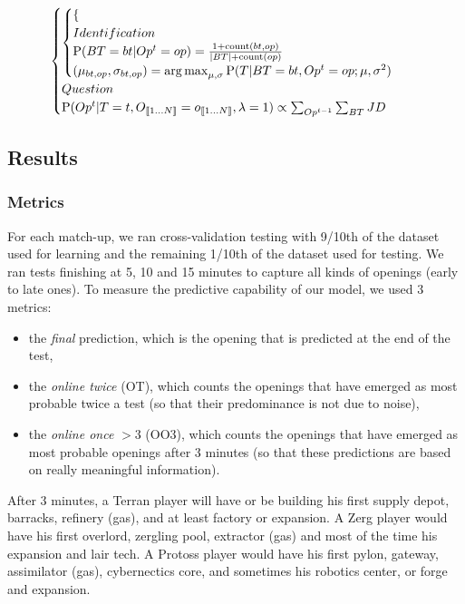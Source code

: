 \begin{eqnarray*}
\begin{cases}
\begin{cases}
\begin{cases}
        \end{cases}\\
    Identification\\
            \mathrm{P}(BT=bt | Op^t=op) = \frac{1 + \mathrm{count}(bt,op)}{\left\lvert BT\right\rvert + \mathrm{count}(op)}\\
            (\mu_{bt,op},\sigma_{bt,op}) = \operatorname*{arg\,max}_{\mu,\sigma}\mathrm{P}(T|BT=bt, Op^t=op; \mu,\sigma^2)\\
    \end{cases}\\
Question \\
 \mathrm{P}(Op^t|T=t, O_{\llbracket 1\dots N\rrbracket}=o_{\llbracket 1\dots N\rrbracket}, \lambda = 1) \propto \sum_{Op^{t-1}}\sum_{BT} JD \\
\end{cases}
\end{eqnarray*}


\subsection{Results}

\subsubsection{Metrics}
For each match-up, we ran cross-validation testing with 9/10th of the dataset used for learning and the remaining 1/10th of the dataset used for testing. We ran tests finishing at 5, 10 and 15 minutes to capture all kinds of openings (early to late ones). To measure the predictive capability of our model, we used 3 metrics: 
\begin{itemize}
\item the \textit{final} prediction, which is the opening that is predicted at the end of the test, 
\item the \textit{online twice} (OT), which counts the openings that have emerged as most probable twice a test (so that their predominance is not due to noise),
\item the \textit{online once} $> 3$ (OO3), which counts the openings that have emerged as most probable openings after 3 minutes (so that these predictions are based on really meaningful information).
\end{itemize}
After 3 minutes, a Terran player will have or be building his first supply depot, barracks, refinery (gas), and at least factory or expansion. A Zerg player would have his first overlord, zergling pool, extractor (gas) and most of the time his expansion and lair tech. A Protoss player would have his first pylon, gateway, assimilator (gas), cybernectics core, and sometimes his robotics center, or forge and expansion.


